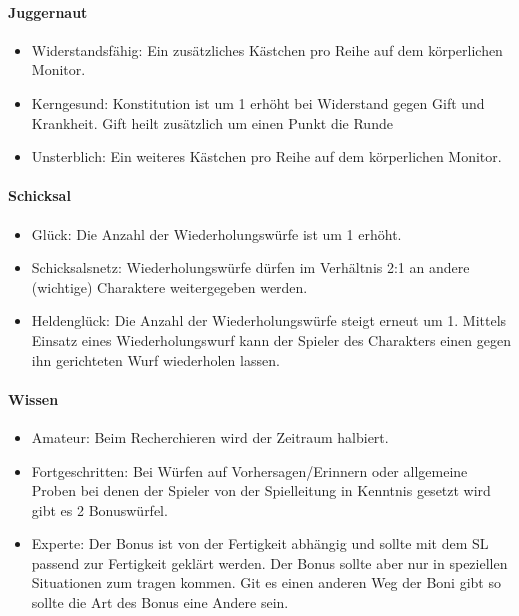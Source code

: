 \documentclass{article}
\begin{document}
\paragraph{Juggernaut}

\begin{itemize}
\item Widerstandsfähig: Ein zusätzliches Kästchen pro Reihe auf dem körperlichen Monitor.
\item Kerngesund: Konstitution ist um 1 erhöht bei Widerstand gegen Gift und Krankheit. Gift heilt zusätzlich um einen Punkt die Runde
\item Unsterblich: Ein weiteres Kästchen pro Reihe auf dem körperlichen Monitor.
\end{itemize}

\paragraph{Schicksal}

\begin{itemize}
\item Glück: Die Anzahl der Wiederholungswürfe ist um 1 erhöht.
\item Schicksalsnetz: Wiederholungswürfe dürfen im Verhältnis 2:1 an andere (wichtige) Charaktere weitergegeben werden.
\item Heldenglück: Die Anzahl der Wiederholungswürfe steigt erneut um 1. Mittels Einsatz eines Wiederholungswurf kann der Spieler des Charakters einen gegen ihn gerichteten Wurf wiederholen lassen.
\end{itemize}

\paragraph{Wissen}

\begin{itemize}
\item Amateur: Beim Recherchieren wird der Zeitraum halbiert.
\item Fortgeschritten: Bei Würfen auf Vorhersagen/Erinnern oder allgemeine Proben bei denen der Spieler von der Spielleitung in Kenntnis gesetzt wird gibt es 2 Bonuswürfel.
\item Experte: Der Bonus ist von der Fertigkeit abhängig und sollte mit dem SL passend zur Fertigkeit geklärt werden. Der Bonus sollte aber nur in speziellen Situationen zum tragen kommen. Git es einen anderen Weg der Boni gibt so sollte die Art des Bonus eine Andere sein.
\end{itemize}
\end{document}

